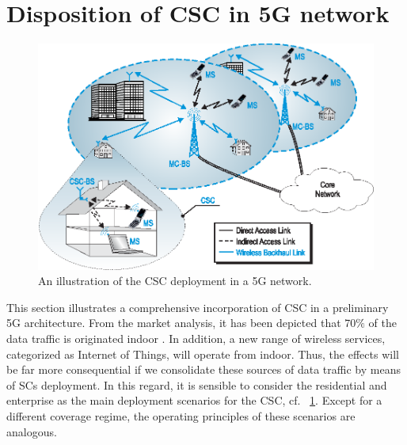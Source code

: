 \documentclass[draftcls, onecolumn, 11pt]{IEEEtran}
\begin{document}


\section{Disposition of CSC in 5G network} \label{sec:depl}
\begin{figure}[!t]
\centering
\includegraphics[width = 0.7 \columnwidth]{figures/Cellular_Scenario_CR6F}
\caption{An illustration of the CSC deployment in a 5G network.}
\label{fig:scenario}
\end{figure}
This section illustrates a comprehensive incorporation of CSC in a preliminary 5G architecture. From the market analysis, it has been depicted that $70\%$ of the data traffic is originated indoor \cite{Chander08}. In addition, a new range of wireless services, categorized as Internet of Things, will operate from indoor. Thus, the effects will be far more consequential if we consolidate these sources of data traffic by means of SCs deployment. In this regard, it is sensible to consider the residential and enterprise as the main deployment scenarios for the CSC, cf. \figurename~\ref{fig:scenario}. Except for a different coverage regime, the operating principles of these scenarios are analogous. 
\end{document}
